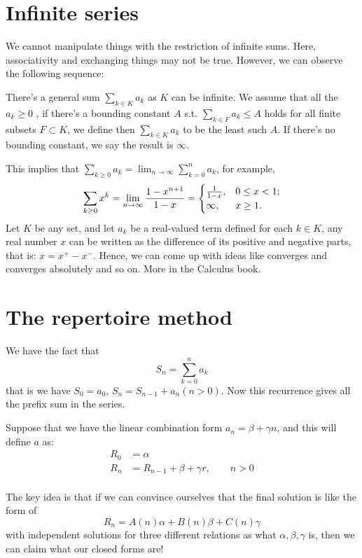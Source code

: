 \section{Infinite series} 

We cannot manipulate things with the restriction of infinite sums. 
Here, associativity and exchanging things may not be true. However, we 
can observe the following sequence: 

There's a general sum $\sum_{k \in K}^{}a_k$ as $K$ can be infinite. 
We assume that all the $a_k\geq 0$
, if there's a bounding constant $A$ s.t. $\sum_{k\in F}a_k\leq A$ holds
for all finite subsets $F \subset K$, we define then $\sum_{k\in K}a_k$
to be the least such $A$. If there's no bounding constant, we say 
the result is $\infty$.

This implies that $\sum_{k\geq 0}a_k=\lim_{n\to \infty} \sum_{k=0}^{n}a_k$,
for example, 
\[
    \sum_{k\geq 0}^{}x^k = \lim_{n \to \infty} {1-x^{n+1}\over 1-x}
    =
    \begin{cases}
        {1\over 1-x}, & 0\leq x< 1;\\
        \infty, &x\geq 1.
    \end{cases}
\]
Let $K$ be any set, and let $a_k$ be a real-valued term defined for each 
$k\in K$, any real number $x$ can be written as the difference of its 
positive and negative parts, that is: $x=x^+-x^-$. Hence, we can come up 
with ideas like converges and converges absolutely and so on. More in the 
Calculus book. 

\section{The repertoire method}

 We have the fact that
\[
    S_n =\sum_{k=0}^{n}a_k
\]
that is we have $S_0 = a_0$, $S_n = S_{n-1}+a_n (n>0)$. 
Now this recurrence gives all the prefix sum in the series. 

Suppose that we have the linear combination form $a_n=\beta + \gamma n$,
and this will define $a$ as: 
\begin{align*}
    R_0 &= \alpha  \\
    R_n &= R_{n-1}+\beta+\gamma r, \qquad n>0 \\
\end{align*}

The key idea is that if we can convince ourselves that the final solution
is like the form of
\[
    R_n = A(n)\alpha+B(n)\beta+C(n)\gamma 
\]
with independent solutions for three different relations as what 
$\alpha,\beta,\gamma$ is, then we can claim what our closed forms 
are! 

